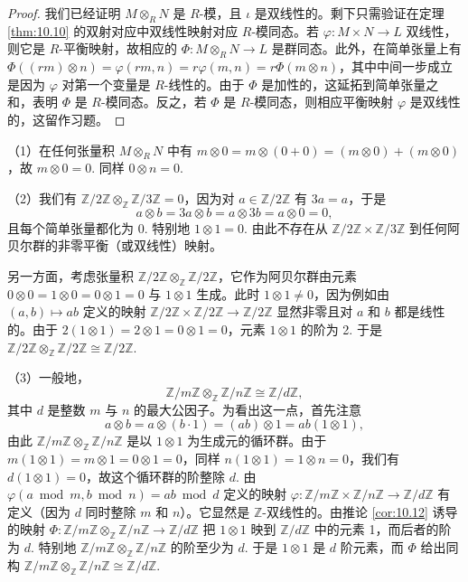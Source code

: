 \begin{proof}
我们已经证明 \(M \otimes_R N\) 是 \(R\)-模，且 \(\iota\) 是双线性的。剩下只需验证在定理 \ref{thm:10.10} 的双射对应中双线性映射对应 \(R\)-模同态。若 \(\varphi : M \times N \to L\) 双线性，则它是 \(R\)-平衡映射，故相应的 \(\Phi : M \otimes_R N \to L\) 是群同态。此外，在简单张量上有 \(\Phi((rm) \otimes n) = \varphi(rm, n) = r\varphi(m, n) = r\Phi(m \otimes n)\)，其中中间一步成立是因为 \(\varphi\) 对第一个变量是 \(R\)-线性的。由于 \(\Phi\) 是加性的，这延拓到简单张量之和，表明 \(\Phi\) 是 \(R\)-模同态。反之，若 \(\Phi\) 是 \(R\)-模同态，则相应平衡映射 \(\varphi\) 是双线性的，这留作习题。
\end{proof}

\begin{example}
（1）在任何张量积 \(M \otimes_R N\) 中有 \(m \otimes 0 = m \otimes (0+0) = (m \otimes 0)+(m \otimes 0)\)，故 \(m \otimes 0 = 0\). 同样 \(0 \otimes n = 0\).

（2）我们有 \(\mathbb{Z}/2\mathbb{Z} \otimes_{\mathbb{Z}} \mathbb{Z}/3\mathbb{Z} = 0\)，因为对 \(a \in \mathbb{Z}/2\mathbb{Z}\) 有 \(3a = a\)，于是
\[
a \otimes b = 3a \otimes b = a \otimes 3b = a \otimes 0 = 0,
\]
且每个简单张量都化为 0. 特别地 \(1 \otimes 1 = 0\). 由此不存在从 \(\mathbb{Z}/2\mathbb{Z} \times \mathbb{Z}/3\mathbb{Z}\) 到任何阿贝尔群的非零平衡（或双线性）映射。

另一方面，考虑张量积 \(\mathbb{Z}/2\mathbb{Z} \otimes_{\mathbb{Z}} \mathbb{Z}/2\mathbb{Z}\)，它作为阿贝尔群由元素 \(0 \otimes 0 = 1 \otimes 0 = 0 \otimes 1 = 0\) 与 \(1 \otimes 1\) 生成。此时 \(1 \otimes 1 \neq 0\)，因为例如由 \((a, b) \mapsto ab\) 定义的映射 \(\mathbb{Z}/2\mathbb{Z} \times \mathbb{Z}/2\mathbb{Z} \to \mathbb{Z}/2\mathbb{Z}\) 显然非零且对 \(a\) 和 \(b\) 都是线性的。由于 \(2(1 \otimes 1) = 2 \otimes 1 = 0 \otimes 1 = 0\)，元素 \(1 \otimes 1\) 的阶为 2. 于是 \(\mathbb{Z}/2\mathbb{Z} \otimes_{\mathbb{Z}} \mathbb{Z}/2\mathbb{Z} \cong \mathbb{Z}/2\mathbb{Z}\).

（3）一般地，
\[
\mathbb{Z}/m\mathbb{Z} \otimes_{\mathbb{Z}} \mathbb{Z}/n\mathbb{Z} \cong \mathbb{Z}/d\mathbb{Z},
\]
其中 \(d\) 是整数 \(m\) 与 \(n\) 的最大公因子。为看出这一点，首先注意
\[
a \otimes b = a \otimes (b \cdot 1) = (ab) \otimes 1 = ab(1 \otimes 1),
\]
由此 \(\mathbb{Z}/m\mathbb{Z} \otimes_{\mathbb{Z}} \mathbb{Z}/n\mathbb{Z}\) 是以 \(1 \otimes 1\) 为生成元的循环群。由于 \(m(1 \otimes 1) = m \otimes 1 = 0 \otimes 1 = 0\)，同样 \(n(1 \otimes 1) = 1 \otimes n = 0\)，我们有 \(d(1 \otimes 1) = 0\)，故这个循环群的阶整除 \(d\). 由 \(\varphi(a \bmod m, b \bmod n) = ab \bmod d\) 定义的映射 \(\varphi : \mathbb{Z}/m\mathbb{Z} \times \mathbb{Z}/n\mathbb{Z} \to \mathbb{Z}/d\mathbb{Z}\) 有定义（因为 \(d\) 同时整除 \(m\) 和 \(n\)）。它显然是 \(\mathbb{Z}\)-双线性的。由推论 \ref{cor:10.12} 诱导的映射 \(\Phi : \mathbb{Z}/m\mathbb{Z} \otimes_{\mathbb{Z}} \mathbb{Z}/n\mathbb{Z} \to \mathbb{Z}/d\mathbb{Z}\) 把 \(1 \otimes 1\) 映到 \(\mathbb{Z}/d\mathbb{Z}\) 中的元素 1，而后者的阶为 \(d\). 特别地 \(\mathbb{Z}/m\mathbb{Z} \otimes_{\mathbb{Z}} \mathbb{Z}/n\mathbb{Z}\) 的阶至少为 \(d\). 于是 \(1 \otimes 1\) 是 \(d\) 阶元素，而 \(\Phi\) 给出同构 \(\mathbb{Z}/m\mathbb{Z} \otimes_{\mathbb{Z}} \mathbb{Z}/n\mathbb{Z} \cong \mathbb{Z}/d\mathbb{Z}\).


\end{example}
